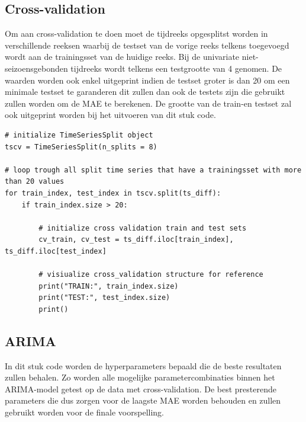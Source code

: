 \subsection{Cross-validation}

Om aan cross-validation te doen moet de tijdreeks opgesplitst worden in verschillende reeksen waarbij de testset van de vorige reeks telkens toegevoegd wordt aan de trainingsset van de huidige reeks. Bij de univariate niet-seizoensgebonden tijdreeks wordt telkens een testgrootte van 4 genomen. De waarden worden ook enkel uitgeprint indien de testset groter is dan 20 om een minimale testset te garanderen dit zullen dan ook de testets zijn die gebruikt zullen worden om de MAE te berekenen. De grootte van de train-en testset zal ook uitgeprint worden bij het uitvoeren van dit stuk code.

\begin{verbatim}
# initialize TimeSeriesSplit object
tscv = TimeSeriesSplit(n_splits = 8)

# loop trough all split time series that have a trainingsset with more than 20 values
for train_index, test_index in tscv.split(ts_diff):
    if train_index.size > 20:

        # initialize cross validation train and test sets
        cv_train, cv_test = ts_diff.iloc[train_index], ts_diff.iloc[test_index]
        
        # visiualize cross_validation structure for reference
        print("TRAIN:", train_index.size)
        print("TEST:", test_index.size)
        print()
\end{verbatim}

\subsection{ARIMA}

In dit stuk code worden de hyperparameters bepaald die de beste resultaten zullen behalen. Zo worden alle mogelijke parametercombinaties binnen het ARIMA-model getest op de data met cross-validation. De best presterende parameters die dus zorgen voor de laagste MAE worden behouden en zullen gebruikt worden voor de finale voorspelling.

